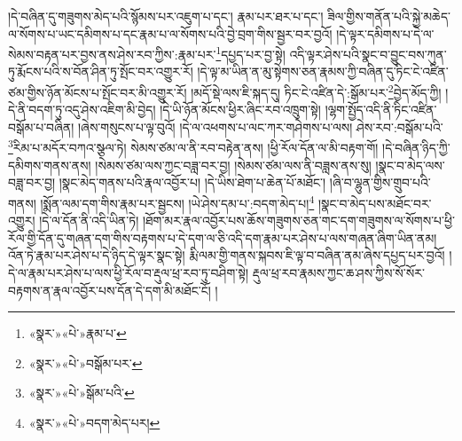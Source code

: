 །དེ་བཞིན་དུ་གཟུགས་མེད་པའི་སྙོམས་པར་འཇུག་པ་དང་། རྣམ་པར་ཐར་པ་དང་། ཟིལ་གྱིས་གནོན་པའི་སྐྱེ་མཆེད་ལ་སོགས་པ་ཡང་དམིགས་པ་དང་རྣམ་པ་ལ་སོགས་པའི་བྱེ་བྲག་གིས་སྦྱར་བར་བྱའོ། །དེ་ལྟར་དམིགས་པ་དེ་ལ་སེམས་བརྟན་པར་བྱས་ནས་ཤེས་རབ་ཀྱིས་:རྣམ་པར་\footnote{«སྣར་»«པེ་»རྣམ་པ་}དཔྱད་པར་བྱ་སྟེ། འདི་ལྟར་ཤེས་པའི་སྣང་བ་བྱུང་བས་ཀུན་ཏུ་རྨོངས་པའི་ས་བོན་ཤིན་ཏུ་སྤོང་བར་འགྱུར་རོ། །དེ་ལྟ་མ་ཡིན་ན་མུ་སྟེགས་ཅན་རྣམས་ཀྱི་བཞིན་དུ་ཏིང་ངེ་འཛིན་ཙམ་གྱིས་ཉོན་མོངས་པ་སྤོང་བར་མི་འགྱུར་རོ། །མདོ་སྡེ་ལས་ཇི་སྐད་དུ། ཏིང་ངེ་འཛིན་དེ་:སྒོམ་པར་\footnote{«སྣར་»«པེ་»བསྒོམ་པར་}བྱེད་མོད་ཀྱི། །དེ་ནི་བདག་ཏུ་འདུ་ཤེས་འཇིག་མི་བྱེད། །དེ་ཡི་ཉོན་མོངས་ཕྱིར་ཞིང་རབ་འཁྲུག་སྟེ། །ལྷག་སྤྱོད་འདི་ནི་ཏིང་འཛིན་བསྒོམ་པ་བཞིན། །ཞེས་གསུངས་པ་ལྟ་བུའོ། །དེ་ལ་འཕགས་པ་ལང་ཀར་གཤེགས་པ་ལས། ཤེས་རབ་:བསྒོམ་པའི་\footnote{«སྣར་»«པེ་»སྒོམ་པའི་}རིམ་པ་མདོར་བཀའ་སྩལ་ཏེ། སེམས་ཙམ་ལ་ནི་རབ་བརྟེན་ནས། །ཕྱི་རོལ་དོན་ལ་མི་བརྟག་གོ། །དེ་བཞིན་ཉིད་ཀྱི་དམིགས་གནས་ནས། །སེམས་ཙམ་ལས་ཀྱང་བཟླ་བར་བྱ། །སེམས་ཙམ་ལས་ནི་བཟླས་ནས་སུ། །སྣང་བ་མེད་ལས་བཟླ་བར་བྱ། །སྣང་མེད་གནས་པའི་རྣལ་འབྱོར་པ། །དེ་ཡིས་ཐེག་པ་ཆེན་པོ་མཐོང་། །ཞི་བ་ལྷུན་གྱིས་གྲུབ་པའི་གནས། །སྨོན་ལམ་དག་གིས་རྣམ་པར་སྦྱངས། །ཡེ་ཤེས་དམ་པ་:བདག་མེད་པ།\footnote{«སྣར་»«པེ་»བདག་མེད་པར།} །སྣང་བ་མེད་པས་མཐོང་བར་འགྱུར། །དེ་ལ་དོན་ནི་འདི་ཡིན་ཏེ། །ཐོག་མར་རྣལ་འབྱོར་པས་ཆོས་གཟུགས་ཅན་གང་དག་གཟུགས་ལ་སོགས་པ་ཕྱི་རོལ་གྱི་དོན་དུ་གཞན་དག་གིས་བརྟགས་པ་དེ་དག་ལ་ཅི་འདི་དག་རྣམ་པར་ཤེས་པ་ལས་གཞན་ཞིག་ཡིན་ནམ། འོན་ཏེ་རྣམ་པར་ཤེས་པ་དེ་ཉིད་དེ་ལྟར་སྣང་སྟེ། རྨི་ལམ་གྱི་གནས་སྐབས་ཇི་ལྟ་བ་བཞིན་ནམ་ཞེས་དཔྱད་པར་བྱའོ། །དེ་ལ་རྣམ་པར་ཤེས་པ་ལས་ཕྱི་རོལ་བ་རྡུལ་ཕྲ་རབ་ཏུ་བཤིག་སྟེ། རྡུལ་ཕྲ་རབ་རྣམས་ཀྱང་ཆ་ཤས་ཀྱིས་སོ་སོར་བརྟགས་ན་རྣལ་འབྱོར་པས་དོན་དེ་དག་མི་མཐོང་ངོ། །
